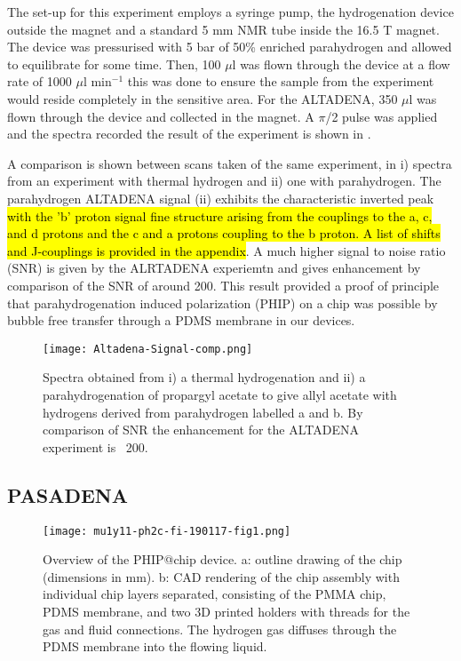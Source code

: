 The set-up for this experiment employs a syringe pump, the hydrogenation device
outside the magnet and a standard 5 mm NMR tube inside the 16.5 T magnet. The device
was pressurised with 5 bar of 50\% enriched parahydrogen and allowed to equilibrate
for some time. Then, 100 $\mu$l was flown through the device at a flow rate of 1000
$\mu$l min$^{-1}$ this was done to ensure the sample from the experiment would reside
completely in the sensitive area. For the ALTADENA, 350 $\mu$l was flown through
the device and collected in the magnet. A $\pi$/2 pulse was applied and the spectra
recorded the result of the experiment is shown in .

A comparison is shown between scans taken of the same experiment, in  i) spectra
from an experiment with thermal hydrogen and ii) one with parahydrogen. The parahydrogen
ALTADENA signal (ii) exhibits the characteristic inverted peak \hl{with the 'b' proton signal fine structure
arising from the couplings to the a, c, and d protons and the c and a protons coupling to the b proton. A list
of shifts and J-couplings is provided in the appendix}. A much higher signal
to noise ratio (SNR) is given by the ALRTADENA experiemtn and gives enhancement by comparison of the SNR of around 200.
This result provided a proof of principle that parahydrogenation induced polarization (PHIP) on a chip
was possible by bubble free transfer through a PDMS membrane in our devices.

\begin{figure}[ht]
  \begin{center}
  \texttt{[image: Altadena-Signal-comp.png]}
  \end{center}
  \caption{Spectra obtained from i) a thermal hydrogenation and ii) a parahydrogenation
  of propargyl acetate to give allyl acetate with hydrogens derived from parahydrogen labelled a and
  b. By comparison of SNR the enhancement for the ALTADENA experiment is ~200. }
  \label{fig:AltadenaResults}
\end{figure}

\newpage

\subsection{PASADENA}

\begin{figure}[!ht]
	\centering
	\texttt{[image: mu1y11-ph2c-fi-190117-fig1.png]}
	\caption{Overview of the PHIP@chip device.
    a: outline drawing of the chip (dimensions in mm).
		b: CAD rendering of the chip assembly with individual chip layers
		separated, consisting of the PMMA chip, PDMS membrane, and two 3D
		printed holders with threads for the gas and fluid connections.
    The hydrogen gas
		diffuses through the PDMS membrane into the flowing liquid.
		}
	\label{fig:phip@chip1}
\end{figure}

